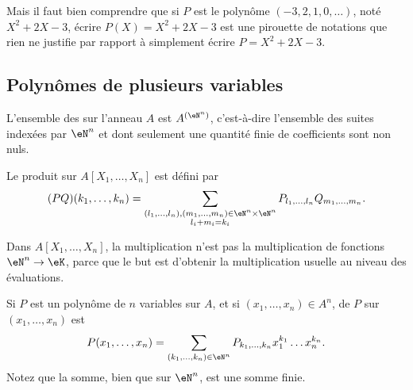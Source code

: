 Mais il faut bien comprendre que si \( P\) est le polynôme \( (-3,2,1,0,\ldots)\), noté \( X^2+2X-3\), écrire \( P(X)=X^2+2X-3\) est une pirouette de notations que rien ne justifie par rapport à simplement écrire \( P=X^2+2X-3\).

\subsection{Polynômes de plusieurs variables}

\begin{definition}      \label{DEFooZNHOooCruuwI}
    L'ensemble des  sur l'anneau \( A\) est \( A^{(\eN^n)}\), c'est-à-dire l'ensemble des suites indexées par \( \eN^n\) et dont seulement une quantité finie de coefficients sont non nuls.

    Le produit sur \( A[X_1,\ldots, X_n]\) est défini par
    \begin{equation}
        (PQ)(k_1,\ldots, k_n)=\sum_{\substack{ (l_1,\ldots, l_n),(m_1,\ldots, m_n)\in \eN^n\times \eN^n   \\l_i+m_i=k_i}}P_{l_1,\ldots, l_n}Q_{m_1,\ldots, m_n}.
        \end{equation}
\end{definition}

\begin{normaltext}
    Dans \( A[X_1,\ldots, X_n]\), la multiplication n'est pas la multiplication de fonctions \( \eN^n\to \eK\), parce que le but est d'obtenir la multiplication usuelle au niveau des évaluations.
\end{normaltext}

\begin{definition}
    Si \( P\) est un polynôme de \( n\) variables sur \( A\), et si \( (x_1,\ldots, x_n)\in A^n\),  de \( P\) sur \( (x_1,\ldots, x_n)\) est
    \begin{equation}
        P(x_1,\ldots, x_n)=\sum_{(k_1,\ldots, k_n)\in \eN^n}P_{k_1,\ldots, k_n}x_1^{k_1}\ldots x_n^{k_n}.
    \end{equation}
    Notez que la somme, bien que sur \( \eN^n\), est une somme finie.
\end{definition}

